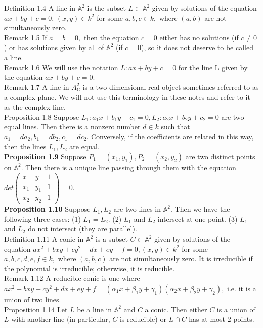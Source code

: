 \documentclass[8pt]{extarticle}
\begin{document}
Definition 1.4 A line in $\mathbb{A}^2$ is the subset $L\subset \mathbb{A}^2$ given by solutions of the equation $ax+by+c=0,\,(x,y)\in k^2$ for some $a,b,c\in k,$ where $(a,b)$ are not simultaneously zero.\\
Remark 1.5 If $a = b = 0,$ then the equation $c = 0$ either has no solutions (if
$c\neq 0$) or has solutions given by all of $\mathbb{A}^2$ (if $c = 0$), so it does not deserve to be called a line.\\
Remark 1.6 We will use the notation $L : ax + by + c = 0$ for the line L given by the equation $ax + by + c = 0$.\\
Remark 1.7 A line in $A^2_\mathbb{C}$ is a two-dimensional real object sometimes referred to as a complex plane. We
will not use this terminology in these notes and refer to it as the complex line.\\
Proposition 1.8 Suppose $L_1 :a_1x+b_1y+c_1 =0, L_2 :a_2x+b_2y+c_2 =0$ are two equal lines. Then there is a nonzero number $d\in k$ such that
$a_1 =da_2, b_1 =db_2, c_1 =dc_2.$ Conversely, if the coefficients are related in this way, then the lines $L_1,L_2$ are equal.\\
\textbf{Proposition 1.9} Suppose $P_1 = (x_1,y_1),P_2 = (x_2,y_2)$ are two distinct points on $\mathbb{A}^2.$ Then there is a unique line passing through them with the equation $det\begin{pmatrix}
x & y & 1\\
x_1 & y_1 & 1\\
x_2 & y_2 & 1
\end{pmatrix}=0.$\\
\textbf{Proposition 1.10} Suppose $L_1,L_2$ are two lines in $\mathbb{A}^2.$ Then we have the following three cases: (1) $L_1 = L_2.$ (2) $L_1$ and $L_2$ intersect at one point. (3) $L_1$ and $L_2$ do not intersect (they are parallel).\\
Definition 1.11 A conic in $\mathbb{A}^2$ is a subset $C\subset \mathbb{A}^2$ given by solutions of the equation
$ax^2 +bxy+cy^2 +dx+ey+f =0, (x,y)\in k^2$
for some $a, b, c, d, e, f \in k,$ where $(a, b, c)$ are not simultaneously zero. It is irreducible if the polynomial is irreducible; otherwise, it is reducible.\\
Remark 1.12 A reducible conic is one where
$ax^2 +bxy+cy^2 +dx+ey+f =(\alpha_1x+\beta_1y+\gamma_1)(\alpha_2x+\beta_2y+\gamma_2),$ i.e. it is a union of two lines.\\
Proposition 1.14 Let $L$ be a line in $\mathbb{A}^2$ and $C$ a conic. Then either $C$ is a union of $L$ with another line (in particular, $C$ is reducible) or $L \cap C$ has at most $2$ points.\\
\end{document}
